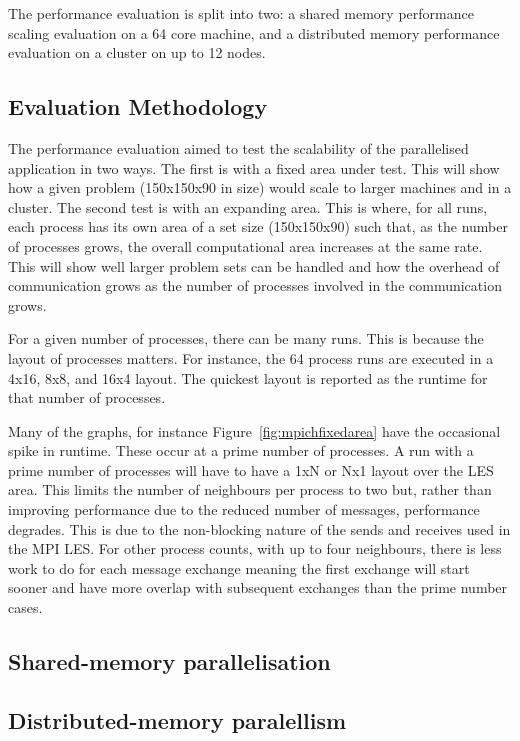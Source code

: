 The performance evaluation is split into two: a shared memory performance
scaling evaluation on a 64 core machine, and a distributed memory performance
evaluation on a cluster on up to 12 nodes.

\subsection{Evaluation Methodology}
\label{sec:mpievaluationmethodology}

The performance evaluation aimed to test the scalability of the parallelised
application in two ways. The first is with a fixed area under test. This will
show how a given problem (150x150x90 in size) would scale to larger machines and
in a cluster. The second test is with an expanding area. This is where, for all
runs, each process has its own area of a set size (150x150x90) such that, as the
number of processes grows, the overall computational area increases at the same
rate. This will show well larger problem sets can be handled and how the
overhead of communication grows as the number of processes involved in the
communication grows.

For a given number of processes, there can be many runs. This is because the
layout of processes matters. For instance, the 64 process runs are executed in a
4x16, 8x8, and 16x4 layout. The quickest layout is reported as the runtime for
that number of processes.

Many of the graphs, for instance Figure~\ref{fig:mpichfixedarea} have the
occasional spike in runtime. These occur at a prime number of processes. A run
with a prime number of processes will have to have a 1xN or Nx1 layout over the
LES area. This limits the number of neighbours per process to two but, rather
than improving performance due to the reduced number of messages, performance
degrades. This is due to the non-blocking nature of the sends and receives used
in the MPI LES. For other process counts, with up to four neighbours, there is
less work to do for each message exchange meaning the first exchange will start
sooner and have more overlap with subsequent exchanges than the prime number
cases.

\subsection{Shared-memory parallelisation}


\subsection{Distributed-memory paralellism}


